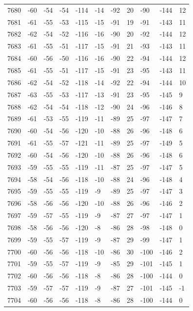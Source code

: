 \begin{table}[H]
\begin{tabular}{lllllllllll}
7680 & -60 & -54 & -54 & -114 & -14 & -92 & 20 & -90 & -144 & 12 \\
7681 & -61 & -55 & -53 & -115 & -15 & -91 & 19 & -91 & -143 & 11 \\
7682 & -62 & -54 & -52 & -116 & -16 & -90 & 20 & -92 & -144 & 12 \\
7683 & -61 & -55 & -51 & -117 & -15 & -91 & 21 & -93 & -143 & 11 \\
7684 & -60 & -56 & -50 & -116 & -16 & -90 & 22 & -94 & -144 & 12 \\
7685 & -61 & -55 & -51 & -117 & -15 & -91 & 23 & -95 & -143 & 11 \\
7686 & -62 & -54 & -52 & -118 & -14 & -92 & 22 & -94 & -144 & 10 \\
7687 & -63 & -55 & -53 & -117 & -13 & -91 & 23 & -95 & -145 & 9 \\
7688 & -62 & -54 & -54 & -118 & -12 & -90 & 24 & -96 & -146 & 8 \\
7689 & -61 & -53 & -55 & -119 & -11 & -89 & 25 & -97 & -147 & 7 \\
7690 & -60 & -54 & -56 & -120 & -10 & -88 & 26 & -96 & -148 & 6 \\
7691 & -61 & -55 & -57 & -121 & -11 & -89 & 25 & -97 & -149 & 5 \\
7692 & -60 & -54 & -56 & -120 & -10 & -88 & 26 & -96 & -148 & 6 \\
7693 & -59 & -55 & -55 & -119 & -11 & -87 & 25 & -97 & -147 & 5 \\
7694 & -58 & -54 & -56 & -118 & -10 & -88 & 24 & -96 & -148 & 4 \\
7695 & -59 & -55 & -55 & -119 & -9 & -89 & 25 & -97 & -147 & 3 \\
7696 & -58 & -56 & -56 & -120 & -10 & -88 & 26 & -96 & -146 & 2 \\
7697 & -59 & -57 & -55 & -119 & -9 & -87 & 27 & -97 & -147 & 1 \\
7698 & -58 & -56 & -56 & -120 & -8 & -86 & 28 & -98 & -148 & 0 \\
7699 & -59 & -55 & -57 & -119 & -9 & -87 & 29 & -99 & -147 & 1 \\
7700 & -60 & -56 & -56 & -118 & -10 & -86 & 30 & -100 & -146 & 2 \\
7701 & -59 & -55 & -57 & -119 & -9 & -85 & 29 & -101 & -145 & 1 \\
7702 & -60 & -56 & -56 & -118 & -8 & -86 & 28 & -100 & -144 & 0 \\
7703 & -59 & -57 & -57 & -119 & -9 & -87 & 27 & -101 & -145 & -1 \\
7704 & -60 & -56 & -56 & -118 & -8 & -86 & 28 & -100 & -144 & 0 \\

\end{tabular}
\end{table}
